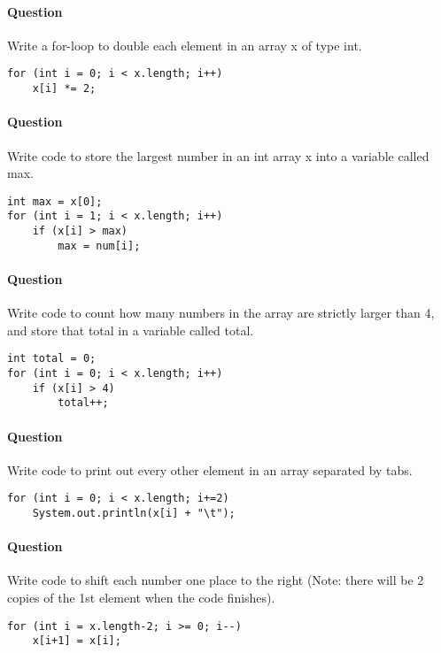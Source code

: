 \documentclass{article}
\begin{document}
\addtocounter{question_num}{1}
\paragraph{Question }
Write a for-loop to double each element in an array x of type int.
\begin{lstlisting}
for (int i = 0; i < x.length; i++)
	x[i] *= 2;
\end{lstlisting}

\addtocounter{question_num}{1}
\paragraph{Question }
Write code to store the largest number in an int array x into a variable called max.
\begin{lstlisting}
int max = x[0];
for (int i = 1; i < x.length; i++)
	if (x[i] > max)
		max = num[i];
\end{lstlisting}


\addtocounter{question_num}{1}
\paragraph{Question }
Write code to count how many numbers in the array are strictly larger than 4, and store that total in a variable called total.
\begin{lstlisting}
int total = 0;
for (int i = 0; i < x.length; i++)
	if (x[i] > 4)
		total++;
\end{lstlisting}

\addtocounter{question_num}{1}
\paragraph{Question }
Write code to print out every other element in an array separated by tabs.
\begin{lstlisting}
for (int i = 0; i < x.length; i+=2)
	System.out.println(x[i] + "\t");
\end{lstlisting}

\addtocounter{question_num}{1}
\paragraph{Question }
Write code to shift each number one place to the right (Note: there will be 2 copies of the 1st element when the code finishes).
\begin{lstlisting}
for (int i = x.length-2; i >= 0; i--)
	x[i+1] = x[i];
\end{lstlisting}
\end{document}
